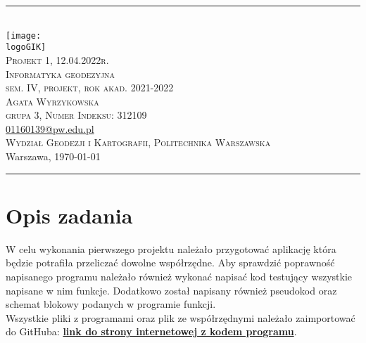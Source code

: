 \documentclass[10pt,a4paper]{article}
\makeatletter
\newcommand{\logoGIK}{settings/WGiK-znak.png}
\newcommand{\authorName}{Agata Wyrzykowska  \\ grupa 3, Numer Indeksu: 312109}
\newcommand{\titeReport}{Projekt 1, 12.04.2022r.}
\newcommand{\titleLecture}{Informatyka geodezyjna \\ sem. IV, projekt, rok akad. 2021-2022}
\newcommand{\mymail}{\href{mailto:01160139@pw.edu.pl}{01160139@pw.edu.pl}}
\newcommand{\faculty}{Wydział Geodezji i Kartografii}
\newcommand{\university}{Politechnika Warszawska}
\newcommand{\city}{Warszawa}
\makeatother
\begin{document}
	\begin{center} 
		\rule{\textwidth}{.5pt} \\
		\vspace{1.0cm} %
		\texttt{[image: \\logoGIK]}
		\vspace{0.5cm} \\
		\Large \textsc{\titeReport}
		\vspace{0.5cm} \\  
		\large \textsc{\titleLecture}
		\vspace{0.5cm}\\
		\textsc{\authorName}  \\
		\mymail \\
		\textsc{\faculty}, \textsc{\university}  \\ 
		\city, \today
	\end{center} 
	\rule{\textwidth}{1.5pt}
	
	
	\tableofcontents 								%
	\newpage
	
	\section{Opis zadania}
	
	W celu wykonania pierwszego projektu należało przygotować aplikację która będzie potrafiła przeliczać dowolne współrzędne. Aby sprawdzić poprawność napisanego programu należało również wykonać napisać kod testujący wszystkie napisane w nim funkcje. Dodatkowo został napisany również pseudokod oraz schemat blokowy podanych w programie funkcji. \\
	Wszystkie pliki z programami oraz plik ze współrzędnymi należało zaimportować do GitHuba: \href{https://github.com/jkluvm/projek1informatyka}{\textbf{link do strony internetowej z kodem programu}}.
	
\end{document}
